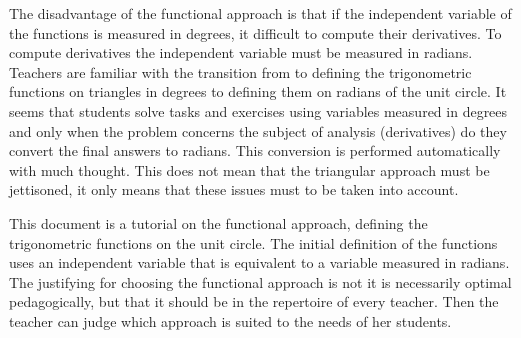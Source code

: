 \newpage

The disadvantage of the functional approach is that if the independent variable of the functions is measured in degrees, it difficult to compute their derivatives.
To compute derivatives the independent variable must be measured in radians.
Teachers are familiar with the transition from to defining the trigonometric functions on triangles in degrees to defining them on radians of the unit circle.
It seems that students solve tasks and exercises using variables measured in degrees and only when the problem concerns the subject of analysis (derivatives) do they convert the final answers to radians.
This conversion is performed automatically with much thought.
This does not mean that the triangular approach must be jettisoned, it only means that these issues must  to be taken into account.

This document is a tutorial on the functional approach, defining the trigonometric functions on the unit circle.
The initial definition of the functions uses an independent variable that is equivalent to a variable measured in radians.
The justifying for choosing the functional approach is not it is necessarily optimal pedagogically, but that it should be in the repertoire of every teacher.
Then the teacher can judge which approach is suited to the needs of her students.

